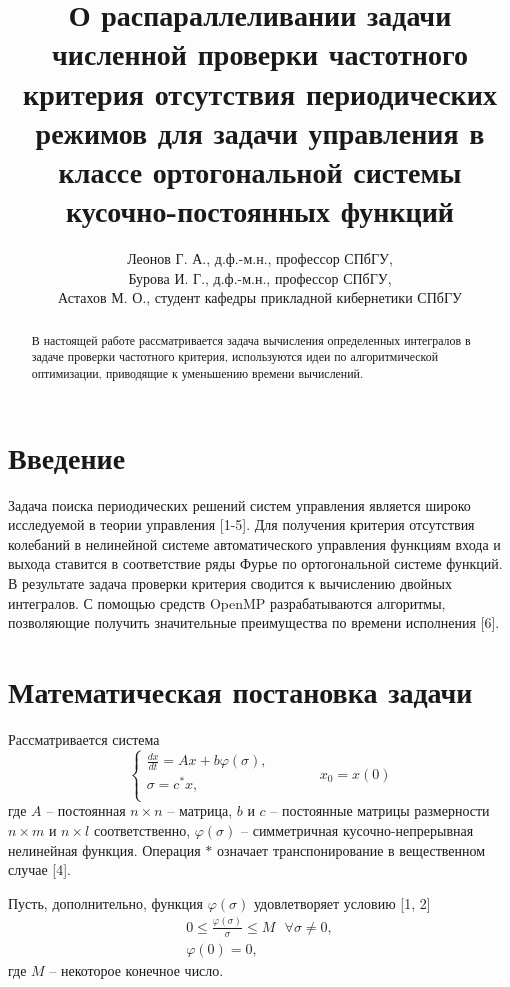 \documentclass{spisok-article}
\title{О распараллеливании задачи численной проверки 
 частотного критерия отсутствия периодических режимов 
 для задачи управления в классе ортогональной системы  кусочно-постоянных функций}
\author{%
  Леонов Г. А.,
  д.ф.-м.н., профессор СПбГУ,

  Бурова И. Г.,
  д.ф.-м.н., профессор СПбГУ,

  Астахов М. О.,
  студент кафедры прикладной кибернетики СПбГУ
}
\begin{document}
\maketitle

\begin{abstract}
В настоящей работе рассматривается задача вычисления
определенных интегралов в задаче проверки частотного критерия, 
используются идеи по алгоритмической оптимизации, приводящие к уменьшению времени вычислений.
\end{abstract}

\section{Введение}

Задача поиска периодических решений систем управления является широко исследуемой в теории управления [1-5]. Для получения критерия отсутствия колебаний в нелинейной системе автоматического управления функциям входа и выхода ставится в соответствие ряды Фурье по ортогональной системе функций. В результате задача проверки критерия сводится к вычислению двойных интегралов. С помощью средств OpenMP  разрабатываются алгоритмы, позволяющие получить значительные преимущества по времени исполнения [6].
\section{Математическая постановка задачи}

Рассматривается система
\begin{equation}
\label{system1}
\left\{
\begin{array}{l}
\frac{dx}{dt} = Ax + b\varphi(\sigma),\\
\sigma = c^{*}x,\\
\end{array}
\right.
\mbox{ } \mbox{ } \mbox{ } \mbox{ } \mbox{ } x_{0} = x(0)
\end{equation}
где $A$ -- постоянная $n \times n$ -- матрица, $b$ и $c$ -- постоянные матрицы размерности $n \times m$ и $n \times l$ соответственно, $\varphi(\sigma)$ -- симметричная кусочно-непрерывная нелинейная функция. Операция $*$ означает транспонирование в вещественном случае [4].

Пусть, дополнительно, функция $\varphi(\sigma)$ удовлетворяет условию [1, 2]
\begin{equation}
\label{conditions1}
\begin{gathered}
0 \leq \frac{\varphi(\sigma)}{\sigma} \leq M  \mbox{   } \forall \sigma \neq 0,\\
\varphi(0)=0,
\end{gathered}
\end{equation}
где $M$ -- некоторое конечное число.
\end{document}
